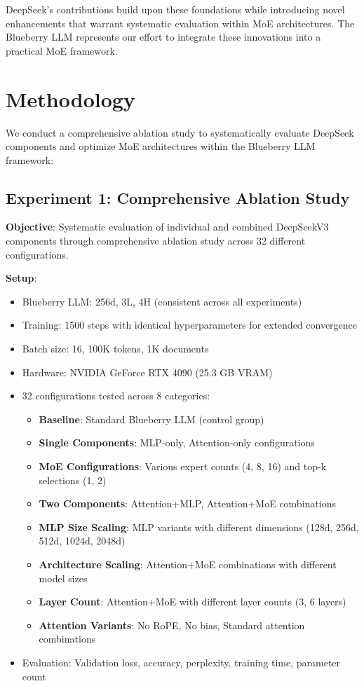 \documentclass[11pt,a4paper]{article}
\begin{document}
DeepSeek's contributions build upon these foundations while introducing novel enhancements that warrant systematic evaluation within MoE architectures. The Blueberry LLM represents our effort to integrate these innovations into a practical MoE framework.

\section{Methodology}

We conduct a comprehensive ablation study to systematically evaluate DeepSeek components and optimize MoE architectures within the Blueberry LLM framework:

\subsection{Experiment 1: Comprehensive Ablation Study}

\textbf{Objective}: Systematic evaluation of individual and combined DeepSeekV3 components through comprehensive ablation study across 32 different configurations.

\textbf{Setup}:
\begin{itemize}
    \item Blueberry LLM: 256d, 3L, 4H (consistent across all experiments)
    \item Training: 1500 steps with identical hyperparameters for extended convergence
    \item Batch size: 16, 100K tokens, 1K documents
    \item Hardware: NVIDIA GeForce RTX 4090 (25.3 GB VRAM)
    \item 32 configurations tested across 8 categories:
    \begin{itemize}
        \item \textbf{Baseline}: Standard Blueberry LLM (control group)
        \item \textbf{Single Components}: MLP-only, Attention-only configurations
        \item \textbf{MoE Configurations}: Various expert counts (4, 8, 16) and top-k selections (1, 2)
        \item \textbf{Two Components}: Attention+MLP, Attention+MoE combinations
        \item \textbf{MLP Size Scaling}: MLP variants with different dimensions (128d, 256d, 512d, 1024d, 2048d)
        \item \textbf{Architecture Scaling}: Attention+MoE combinations with different model sizes
        \item \textbf{Layer Count}: Attention+MoE with different layer counts (3, 6 layers)
        \item \textbf{Attention Variants}: No RoPE, No bias, Standard attention combinations
    \end{itemize}
    \item Evaluation: Validation loss, accuracy, perplexity, training time, parameter count
\end{itemize}
\end{document}
